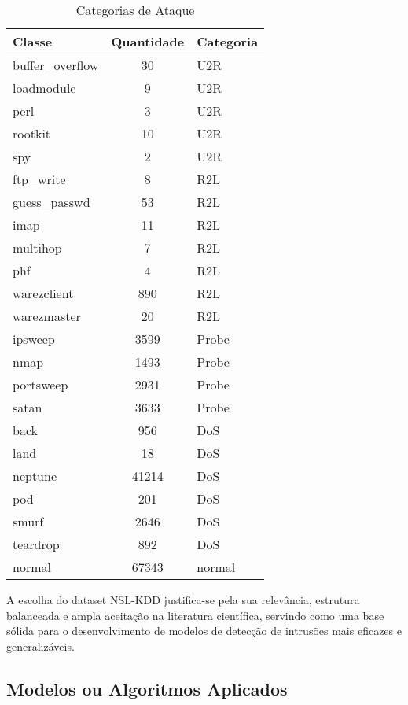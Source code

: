 \documentclass[conference]{IEEEtran}
\begin{document}
    \begin{table}[h]
    \centering
    \begin{tabular}{|l|c|l|}
    \hline
    \rowcolor[HTML]{C0C0C0} 
    \textbf{Classe} & \textbf{Quantidade} & \textbf{Categoria} \\ \hline
    buffer\_overflow & 30 & U2R \\ \hline
    loadmodule & 9 & U2R \\ \hline
    perl & 3 & U2R \\ \hline
    rootkit & 10 & U2R \\ \hline
    spy & 2 & U2R \\ \hline
    ftp\_write & 8 & R2L \\ \hline
    guess\_passwd & 53 & R2L \\ \hline
    imap & 11 & R2L \\ \hline
    multihop & 7 & R2L \\ \hline
    phf & 4 & R2L \\ \hline
    warezclient & 890 & R2L \\ \hline
    warezmaster & 20 & R2L \\ \hline
    ipsweep & 3599 & Probe \\ \hline
    nmap & 1493 & Probe \\ \hline
    portsweep & 2931 & Probe \\ \hline
    satan & 3633 & Probe \\ \hline
    back & 956 & DoS \\ \hline
    land & 18 & DoS \\ \hline
    neptune & 41214 & DoS \\ \hline
    pod & 201 & DoS \\ \hline
    smurf & 2646 & DoS \\ \hline
    teardrop & 892 & DoS \\ \hline
    normal & 67343 & normal \\ \hline
    \end{tabular}
    \caption{Categorias de Ataque}
    \label{tab:attack_datasets}
\end{table}


    
    A escolha do dataset NSL-KDD justifica-se pela sua relevância, estrutura balanceada e ampla aceitação na literatura científica, servindo como uma base sólida para o desenvolvimento de modelos de detecção de intrusões mais eficazes e generalizáveis.
        

\subsection{Modelos ou Algoritmos Aplicados}
\end{document}
